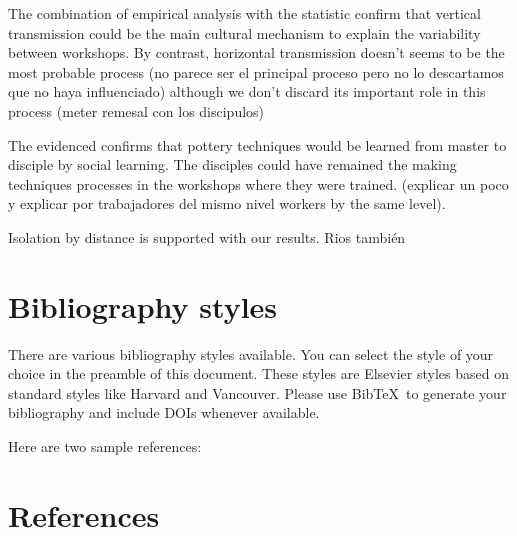 \documentclass[review]{elsarticle}
\begin{document}
The combination of empirical analysis with the statistic confirm that vertical transmission could be the main cultural mechanism to explain the variability between workshops. By contrast, horizontal transmission doesn't seems to be the most probable process (no parece ser el principal proceso pero no lo descartamos que no haya influenciado) although we don't discard its important role in this process (meter remesal con los discipulos)

The evidenced confirms that pottery techniques would be learned from master to disciple by social learning. The disciples could have remained the making techniques processes in the workshops where they were trained. (explicar un poco y explicar por trabajadores del mismo nivel workers by the same level).


Isolation by distance is supported with our results. 
Rios también



\section{Bibliography styles}

There are various bibliography styles available. You can select the style of your choice in the preamble of this document. These styles are Elsevier styles based on standard styles like Harvard and Vancouver. Please use Bib\TeX\ to generate your bibliography and include DOIs whenever available.

Here are two sample references: \citep{mesoudi_cultural_2015}

\section*{References}

%

\end{document}
